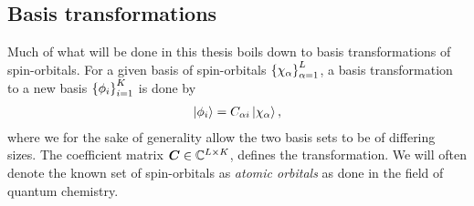         \subsection{Basis transformations}
            \label{subsec:basis-transformation}
            Much of what will be done in this thesis boils down to basis
            transformations of spin-orbitals.
            For a given basis of spin-orbitals
            $\left\{ \chi_{\alpha} \right\}_{\alpha = 1}^{L}$, a basis
            transformation to a new basis $\left\{ \phi_{i} \right\}_{i = 1}^{K}$ is
            done by
            \begin{align}
                \ket{\phi_{i}}
                = C_{\alpha i}\ket{\chi_{\alpha}},
            \end{align}
            where we for the sake of generality allow the two basis sets to be
            of differing sizes.
            The coefficient matrix $\boldsymbol{C} \in \mathbb{C}^{L \times K}$,
            defines the transformation.
            We will often denote the known set of spin-orbitals as \emph{atomic
            orbitals} as done in the field of quantum chemistry.

